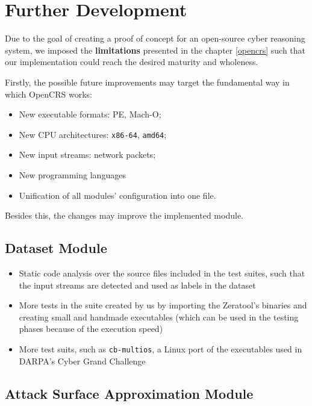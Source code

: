 \documentclass[../main.tex]{subfiles}
\begin{document}
\hypertarget{further-development}{%
\chapter{Further Development}\label{further-development}}

Due to the goal of creating a proof of concept for an open-source cyber
reasoning system, we imposed the \textbf{limitations} presented in the
chapter \ref{opencrs} such that our implementation could reach the desired
maturity and wholeness.

Firstly, the possible future improvements may target the
fundamental way in which OpenCRS works:

\begin{itemize}
\tightlist
\item
  New executable formats: PE, Mach-O;
\item
  New CPU architectures: \texttt{x86-64}, \texttt{amd64};
\item
  New input streams: network packets;
\item
  New programming languages
\item
  Unification of all modules' configuration into one file.
\end{itemize}

Besides this, the changes may improve the implemented module.

\hypertarget{dataset-module}{%
\section{Dataset Module}\label{dataset-module}}

\begin{itemize}
\tightlist
\item
  Static code analysis over the source files included in the test
  suites, such that the input streams are detected and used as labels in
  the dataset
\item
  More tests in the suite created by us by importing the Zeratool's
  binaries and creating small and handmade executables (which can be
  used in the testing phases because of the execution speed)
\item
  More test suits, such as \texttt{cb-multios}, a Linux port of
  the executables used in DARPA's Cyber Grand Challenge
\end{itemize}

\hypertarget{attack-surface-approximation-module}{%
\section{Attack Surface Approximation
Module}\label{attack-surface-approximation-module}}
\end{document}
